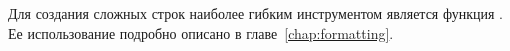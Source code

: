 Для создания сложных строк наиболее гибким инструментом является
функция . Ее использование подробно описано в
главе~\ref{chap:formatting}.



